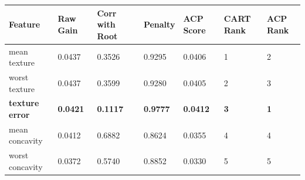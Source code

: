 \begin{tabular}{lllllll}
\toprule
Feature & Raw Gain & Corr with Root & Penalty & ACP Score & CART Rank & ACP Rank \\
\midrule
mean texture & 0.0437 & 0.3526 & 0.9295 & 0.0406 & 1 & 2 \\
worst texture & 0.0437 & 0.3599 & 0.9280 & 0.0405 & 2 & 3 \\
\textbf{texture error} & \textbf{0.0421} & \textbf{0.1117} & \textbf{0.9777} & \textbf{0.0412} & \textbf{3} & \textbf{1} \\
mean concavity & 0.0412 & 0.6882 & 0.8624 & 0.0355 & 4 & 4 \\
worst concavity & 0.0372 & 0.5740 & 0.8852 & 0.0330 & 5 & 5 \\
\bottomrule
\end{tabular}
